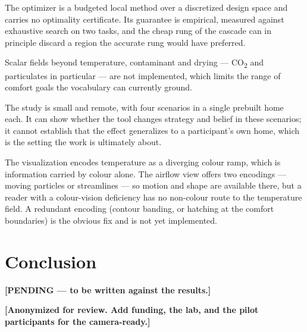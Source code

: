 \documentclass[manuscript,review,anonymous]{acmart}
\begin{document}
The optimizer is a budgeted local method over a discretized design space and
carries no optimality certificate. Its guarantee is empirical, measured against
exhaustive search on two tasks, and the cheap rung of the cascade can in
principle discard a region the accurate rung would have preferred.

Scalar fields beyond temperature, contaminant and drying --- CO\textsubscript{2}
and particulates in particular --- are not implemented, which limits the range of
comfort goals the vocabulary can currently ground.

The study is small and remote, with four scenarios in a single prebuilt home
each. It can show whether the tool changes strategy and belief in these
scenarios; it cannot establish that the effect generalizes to a participant's
own home, which is the setting the work is ultimately about.

The visualization encodes temperature as a diverging colour ramp, which is
information carried by colour alone. The airflow view offers two encodings ---
moving particles or streamlines --- so motion and shape are available there, but
a reader with a colour-vision deficiency has no non-colour route to the
temperature field. A redundant encoding (contour banding, or hatching at the
comfort boundaries) is the obvious fix and is not yet implemented.

\section{Conclusion}

\textbf{[PENDING --- to be written against the results.]}

\begin{acks}
\textbf{[Anonymized for review. Add funding, the lab, and the pilot participants
for the camera-ready.]}
\end{acks}



\end{document}
